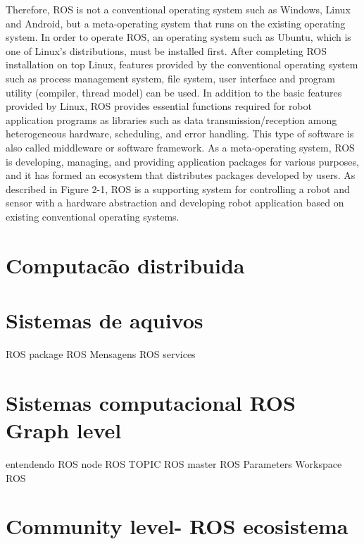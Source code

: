 Therefore, ROS is not a conventional operating system such as Windows, Linux and Android,
but a meta-operating system that runs on the existing operating system. In order to operate ROS,
an operating system such as Ubuntu, which is one of Linux’s distributions, must be installed
first. After completing ROS installation on top Linux, features provided by the conventional
operating system such as process management system, file system, user interface and program
utility (compiler, thread model) can be used. In addition to the basic features provided by Linux,
ROS provides essential functions required for robot application programs as libraries such as
data transmission/reception among heterogeneous hardware, scheduling, and error handling.
This type of software is also called middleware or software framework.
As a meta-operating system, ROS is developing, managing, and providing application
packages for various purposes, and it has formed an ecosystem that distributes packages
developed by users. As described in Figure 2-1, ROS is a supporting system for controlling a
robot and sensor with a hardware abstraction and developing robot application based on existing
conventional operating systems.








\section{Computacão distribuida}

\section{Sistemas de aquivos}
ROS package
ROS Mensagens
ROS services

\section{Sistemas computacional ROS Graph level}
entendendo ROS node
ROS TOPIC
ROS master
ROS Parameters
Workspace ROS


\section{Community level- ROS ecosistema}


















